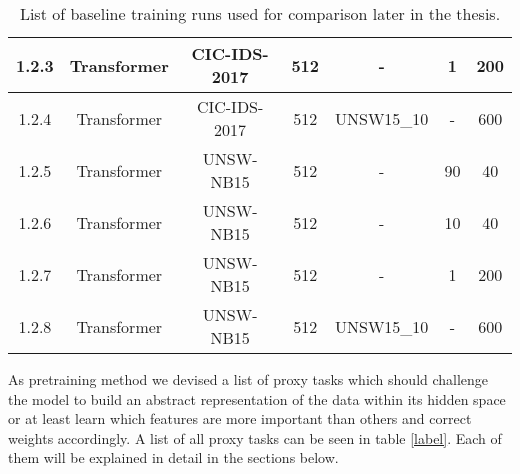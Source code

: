 \begin{table}[h]
{\begin{tabular}{c c c c c c c}
			1.2.3 \label{ex_1_2_3}           & Transformer    & CIC-IDS-2017     & 512                                     & -			& 1                    & 200                                           \\ \midrule
			1.2.4 \label{ex_1_2_4}           & Transformer    & CIC-IDS-2017     & 512                                     & UNSW15\_10	& -                    & 600                                           \\ \midrule
			1.2.5 \label{ex_1_2_5}           & Transformer    & UNSW-NB15        & 512                                     & -			& 90                   & 40                                            \\ \midrule
			1.2.6 \label{ex_1_2_6}           & Transformer    & UNSW-NB15        & 512                                     & -			& 10                   & 40                                            \\ \midrule
			1.2.7 \label{ex_1_2_7}           & Transformer    & UNSW-NB15        & 512                                     & -			& 1                    & 200                                           \\ \midrule
			1.2.8 \label{ex_1_2_8}           & Transformer    & UNSW-NB15        & 512                                     & UNSW15\_10	& -                    & 600                                           \\
	\end{tabular}}
	\caption{List of baseline training runs used for comparison later in the thesis.}
	\label{table:experiments:baseline}
\end{table}

As pretraining method we devised a list of proxy tasks which should challenge the model to build an abstract representation of the data within its hidden space or at least learn which features are more important than others and correct weights accordingly. A list of all proxy tasks can be seen in table \ref{label}. Each of them will be explained in detail in the sections below.

